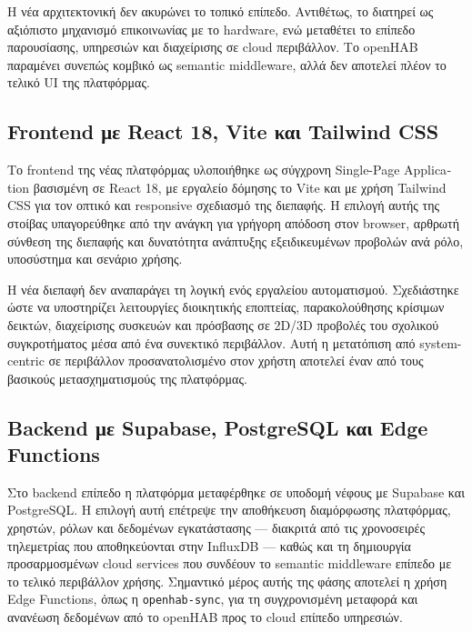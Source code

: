 Η νέα αρχιτεκτονική δεν ακυρώνει το τοπικό επίπεδο. Αντιθέτως, το διατηρεί ως αξιόπιστο μηχανισμό επικοινωνίας με το \textlatin{hardware}, ενώ μεταθέτει το επίπεδο παρουσίασης, υπηρεσιών και διαχείρισης σε \textlatin{cloud} περιβάλλον. Το \textlatin{openHAB} παραμένει συνεπώς κομβικό ως \textlatin{semantic middleware}, αλλά δεν αποτελεί πλέον το τελικό \textlatin{UI} της πλατφόρμας.

\subsection{\texorpdfstring{\textlatin{Frontend} με \textlatin{React 18, Vite} και \textlatin{Tailwind CSS}}{Frontend με React 18, Vite και Tailwind CSS}}
Το \textlatin{frontend} της νέας πλατφόρμας υλοποιήθηκε ως σύγχρονη \textlatin{Single-Page Application} βασισμένη σε \textlatin{React 18}, με εργαλείο δόμησης το \textlatin{Vite} και με χρήση \textlatin{Tailwind CSS} για τον οπτικό και \textlatin{responsive} σχεδιασμό της διεπαφής. Η επιλογή αυτής της στοίβας υπαγορεύθηκε από την ανάγκη για γρήγορη απόδοση στον \textlatin{browser}, αρθρωτή σύνθεση της διεπαφής και δυνατότητα ανάπτυξης εξειδικευμένων προβολών ανά ρόλο, υποσύστημα και σενάριο χρήσης.

Η νέα διεπαφή δεν αναπαράγει τη λογική ενός εργαλείου αυτοματισμού. Σχεδιάστηκε ώστε να υποστηρίζει λειτουργίες διοικητικής εποπτείας, παρακολούθησης κρίσιμων δεικτών, διαχείρισης συσκευών και πρόσβασης σε \textlatin{2D/3D} προβολές του σχολικού συγκροτήματος μέσα από ένα συνεκτικό περιβάλλον. Αυτή η μετατόπιση από \textlatin{system-centric} σε περιβάλλον προσανατολισμένο στον χρήστη αποτελεί έναν από τους βασικούς μετασχηματισμούς της πλατφόρμας.

\subsection{\texorpdfstring{\textlatin{Backend} με \textlatin{Supabase, PostgreSQL} και \textlatin{Edge Functions}}{Backend με Supabase, PostgreSQL και Edge Functions}}
Στο \textlatin{backend} επίπεδο η πλατφόρμα μεταφέρθηκε σε υποδομή νέφους με \textlatin{Supabase} και \textlatin{PostgreSQL}. Η επιλογή αυτή επέτρεψε την αποθήκευση διαμόρφωσης πλατφόρμας, χρηστών, ρόλων και δεδομένων εγκατάστασης --- διακριτά από τις χρονοσειρές τηλεμετρίας που αποθηκεύονται στην \textlatin{InfluxDB} --- καθώς και τη δημιουργία προσαρμοσμένων \textlatin{cloud services} που συνδέουν το \textlatin{semantic middleware} επίπεδο με το τελικό περιβάλλον χρήσης. Σημαντικό μέρος αυτής της φάσης αποτελεί η χρήση \textlatin{Edge Functions}, όπως η \textlatin{\texttt{openhab-sync}}, για τη συγχρονισμένη μεταφορά και ανανέωση δεδομένων από το \textlatin{openHAB} προς το \textlatin{cloud} επίπεδο υπηρεσιών.

